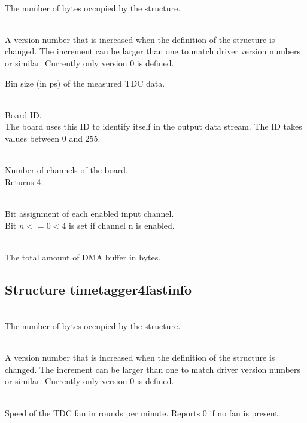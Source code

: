 			\\
			The number of bytes occupied by the structure. \par

			\\
			A version number that is increased when the definition of the structure is changed. The increment can be larger than one to match driver version numbers or similar. Currently only version 0 is defined.\par


			Bin size (in ps) of the measured TDC data.

			\\
			Board ID.\\
			The board uses this ID to identify itself in the output data stream. The ID takes values between 0 and 255.\par

			\\
			Number of channels of the board.\\
			Returns 4.\par

			\\
			Bit assignment of each enabled input channel.\\
			Bit $n <= 0 < 4$ is set if channel n is enabled. \par

			\\
			The total amount of DMA buffer in bytes.

		\subsection{Structure timetagger4\tu fast\tu info}

			\\
			The number of bytes occupied by the structure. \par

			\\
			A version number that is increased when the definition of the structure is changed. The increment can be larger than one to match driver version numbers or similar. Currently only version 0 is defined.\par


			\\
			Speed of the TDC fan in rounds per minute. Reports 0 if no fan is present.\par


